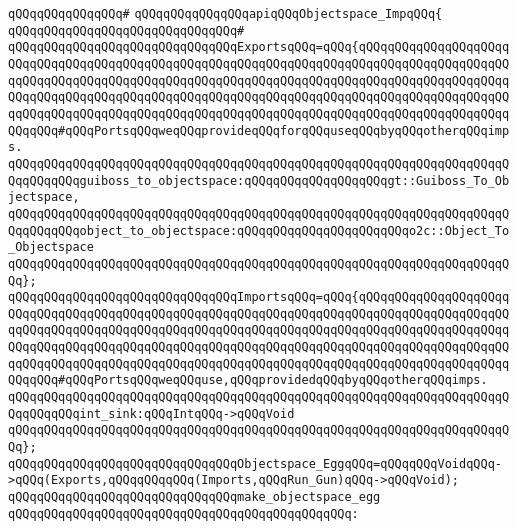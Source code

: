 \verb|qQQqqQQqqQQqqQQq#|\newline
\verb|qQQqqQQqqQQqqQQqapiqQQqObjectspace_ImpqQQq{|\newline
\verb|qQQqqQQqqQQqqQQqqQQqqQQqqQQqqQQq#|\newline
\verb|qQQqqQQqqQQqqQQqqQQqqQQqqQQqqQQqExportsqQQq=qQQq{qQQqqQQqqQQqqQQqqQQqqQQqqQQqqQQqqQQqqQQqqQQqqQQqqQQqqQQqqQQqqQQqqQQqqQQqqQQqqQQqqQQqqQQqqQQqqQQqqQQqqQQqqQQqqQQqqQQqqQQqqQQqqQQqqQQqqQQqqQQqqQQqqQQqqQQqqQQqqQQqqQQqqQQqqQQqqQQqqQQqqQQqqQQqqQQqqQQqqQQqqQQqqQQqqQQqqQQqqQQqqQQqqQQqqQQqqQQqqQQqqQQqqQQqqQQqqQQqqQQqqQQqqQQqqQQqqQQqqQQqqQQqqQQqqQQqqQQqqQQqqQQqqQQq#qQQqPortsqQQqweqQQqprovideqQQqforqQQquseqQQqbyqQQqotherqQQqimps.|\newline
\verb|qQQqqQQqqQQqqQQqqQQqqQQqqQQqqQQqqQQqqQQqqQQqqQQqqQQqqQQqqQQqqQQqqQQqqQQqqQQqqQQqguiboss_to_objectspace:qQQqqQQqqQQqqQQqqQQqgt::Guiboss_To_Objectspace,|\newline
\verb|qQQqqQQqqQQqqQQqqQQqqQQqqQQqqQQqqQQqqQQqqQQqqQQqqQQqqQQqqQQqqQQqqQQqqQQqqQQqqQQqobject_to_objectspace:qQQqqQQqqQQqqQQqqQQqqQQqo2c::Object_To_Objectspace|\newline
\verb|qQQqqQQqqQQqqQQqqQQqqQQqqQQqqQQqqQQqqQQqqQQqqQQqqQQqqQQqqQQqqQQqqQQqqQQq};|\newline
\newline
\verb|qQQqqQQqqQQqqQQqqQQqqQQqqQQqqQQqImportsqQQq=qQQq{qQQqqQQqqQQqqQQqqQQqqQQqqQQqqQQqqQQqqQQqqQQqqQQqqQQqqQQqqQQqqQQqqQQqqQQqqQQqqQQqqQQqqQQqqQQqqQQqqQQqqQQqqQQqqQQqqQQqqQQqqQQqqQQqqQQqqQQqqQQqqQQqqQQqqQQqqQQqqQQqqQQqqQQqqQQqqQQqqQQqqQQqqQQqqQQqqQQqqQQqqQQqqQQqqQQqqQQqqQQqqQQqqQQqqQQqqQQqqQQqqQQqqQQqqQQqqQQqqQQqqQQqqQQqqQQqqQQqqQQqqQQqqQQqqQQqqQQqqQQqqQQqqQQq#qQQqPortsqQQqweqQQquse,qQQqprovidedqQQqbyqQQqotherqQQqimps.|\newline
\verb|qQQqqQQqqQQqqQQqqQQqqQQqqQQqqQQqqQQqqQQqqQQqqQQqqQQqqQQqqQQqqQQqqQQqqQQqqQQqqQQqint_sink:qQQqIntqQQq->qQQqVoid|\newline
\verb|qQQqqQQqqQQqqQQqqQQqqQQqqQQqqQQqqQQqqQQqqQQqqQQqqQQqqQQqqQQqqQQqqQQqqQQq};|\newline
\newline
\verb|qQQqqQQqqQQqqQQqqQQqqQQqqQQqqQQqObjectspace_EggqQQq=qQQqqQQqVoidqQQq->qQQq(Exports,qQQqqQQqqQQq(Imports,qQQqRun_Gun)qQQq->qQQqVoid);|\newline
\newline
\verb|qQQqqQQqqQQqqQQqqQQqqQQqqQQqqQQqmake_objectspace_egg|\newline
\verb|qQQqqQQqqQQqqQQqqQQqqQQqqQQqqQQqqQQqqQQqqQQqqQQq:|\newline

